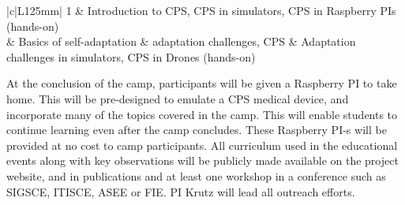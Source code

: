 \documentclass[11pt]{proposalnsf}
\begin{document}
\begin{sloppypar}
\begin{table}[h]
\begin{center}
\begin{tabular}{|c|L{125mm}| }
	1 & Introduction to CPS, CPS in simulators, CPS in Raspberry PIs (hands-on) \\  & Basics of self-adaptation \& adaptation challenges, CPS \& Adaptation challenges in simulators, CPS in Drones (hands-on) \\ \hline
    



    

   \end{tabular}
  \end{center}
\end{table}


At the conclusion of the camp, participants will be given a Raspberry PI to take home. This will be pre-designed to emulate a CPS medical device, and incorporate many of the topics covered in the camp. This will enable students to continue learning even after the camp concludes. These Raspberry PI-s will be provided at no cost to camp participants. All curriculum used in the educational events along with key observations will be publicly made available on the project website, and in publications and at least one workshop in a conference such as SIGSCE, ITISCE, ASEE or FIE. PI Krutz will lead all outreach efforts. %








\end{sloppypar}
\end{document}
